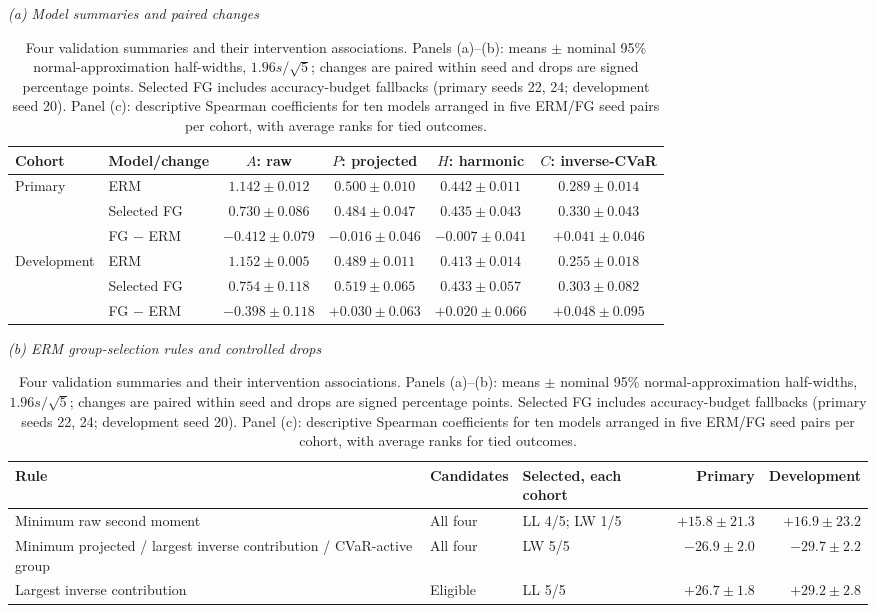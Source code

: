 \begin{table}[htbp]
\centering\small
\setlength{\tabcolsep}{3pt}
\caption{Four validation summaries and their intervention associations. Panels (a)--(b): means $\pm$ nominal 95\% normal-approximation half-widths, $1.96s/\sqrt5$; changes are paired within seed and drops are signed percentage points. Selected FG includes accuracy-budget fallbacks (primary seeds 22, 24; development seed 20). Panel (c): descriptive Spearman coefficients for ten models arranged in five ERM/FG seed pairs per cohort, with average ranks for tied outcomes.}
\label{tab:four-way-swap}
\textit{(a) Model summaries and paired changes}\par\smallskip
\begin{tabular}{@{}llcccc@{}}
\toprule
Cohort & Model/change & $A$: raw & $P$: projected & $H$: harmonic & $C$: inverse-CVaR\\
\midrule
Primary & ERM & $1.142\pm0.012$ & $0.500\pm0.010$ & $0.442\pm0.011$ & $0.289\pm0.014$\\
& Selected FG & $0.730\pm0.086$ & $0.484\pm0.047$ & $0.435\pm0.043$ & $0.330\pm0.043$\\
& FG $-$ ERM & $-0.412\pm0.079$ & $-0.016\pm0.046$ & $-0.007\pm0.041$ & $+0.041\pm0.046$\\
Development & ERM & $1.152\pm0.005$ & $0.489\pm0.011$ & $0.413\pm0.014$ & $0.255\pm0.018$\\
& Selected FG & $0.754\pm0.118$ & $0.519\pm0.065$ & $0.433\pm0.057$ & $0.303\pm0.082$\\
& FG $-$ ERM & $-0.398\pm0.118$ & $+0.030\pm0.063$ & $+0.020\pm0.066$ & $+0.048\pm0.095$\\
\bottomrule
\end{tabular}
\par\smallskip
\textit{(b) ERM group-selection rules and controlled drops}\par\smallskip
\begin{tabular}{@{}>{\raggedright\arraybackslash}p{.34\linewidth}llrr@{}}
\toprule
Rule & Candidates & Selected, each cohort & Primary & Development\\
\midrule
Minimum raw second moment & All four & LL 4/5; LW 1/5 & $+15.8\pm21.3$ & $+16.9\pm23.2$\\
Minimum projected / largest inverse contribution / CVaR-active group & All four & LW 5/5 & $-26.9\pm2.0$ & $-29.7\pm2.2$\\
Largest inverse contribution & Eligible & LL 5/5 & $+26.7\pm1.8$ & $+29.2\pm2.8$\\
\bottomrule

\end{tabular}
\end{table}
